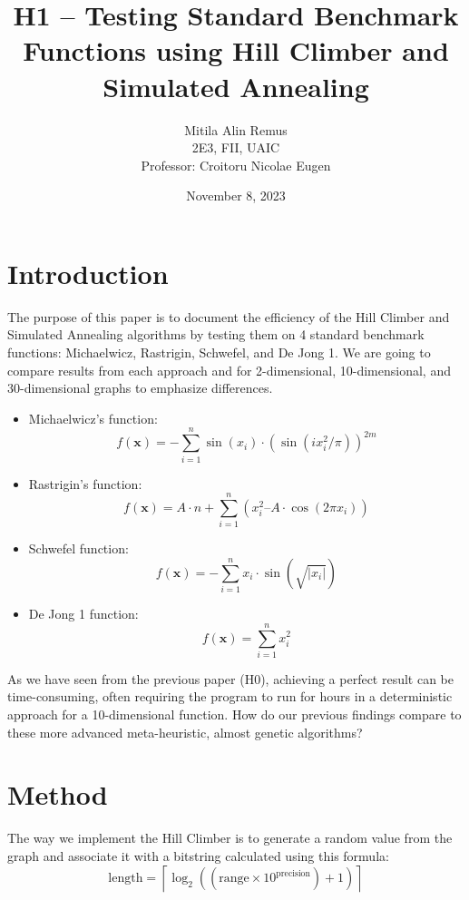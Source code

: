 \documentclass{article}
\title{H1 – Testing Standard Benchmark Functions using Hill Climber and Simulated Annealing}
\author{Mitila Alin Remus \\ 2E3, FII, UAIC \\ Professor: Croitoru Nicolae Eugen}
\date{November 8, 2023}
\begin{document}
\maketitle

\let\oldsection\section
\renewcommand{\section}[1]{
  \oldsection{#1}
  \noindent
}

\newpage
\section{Introduction}
The purpose of this paper is to document the efficiency of the Hill Climber and Simulated Annealing algorithms by testing them on 4 standard benchmark functions: Michaelwicz, Rastrigin, Schwefel, and De Jong 1. We are going to compare results from each approach and for 2-dimensional, 10-dimensional, and 30-dimensional graphs to emphasize differences.

\begin{itemize}
\item Michaelwicz’s function:
$$f(\mathbf{x}) = -\sum_{i=1}^{n} \sin(x_i) \cdot \left(\sin\left(ix_i^2 / \pi\right)\right)^{2m} $$
\item Rastrigin’s function:
$$f(\mathbf{x}) = A \cdot n + \sum_{i=1}^{n} \left( x_i^2 – A \cdot \cos(2\pi x_i) \right) $$
\item Schwefel function:
$$f(\mathbf{x}) = -\sum_{i=1}^{n} x_i \cdot \sin\left(\sqrt{|x_i|}\right)$$
\item De Jong 1 function:
$$f(\mathbf{x}) = \sum_{i=1}^{n} x_i^2$$
\end{itemize}

As we have seen from the previous paper (H0), achieving a perfect result can be time-consuming, often requiring the program to run for hours in a deterministic approach for a 10-dimensional function. How do our previous findings compare to these more advanced meta-heuristic, almost genetic algorithms?

\newpage
\section{Method}
The way we implement the Hill Climber is to generate a random value from the graph and associate it with a bitstring calculated using this formula:
$$\text{length} = \left\lceil \log_2\left( (\text{range} \times 10^{\text{precision}}) + 1 \right) \right\rceil$$
\end{document}
